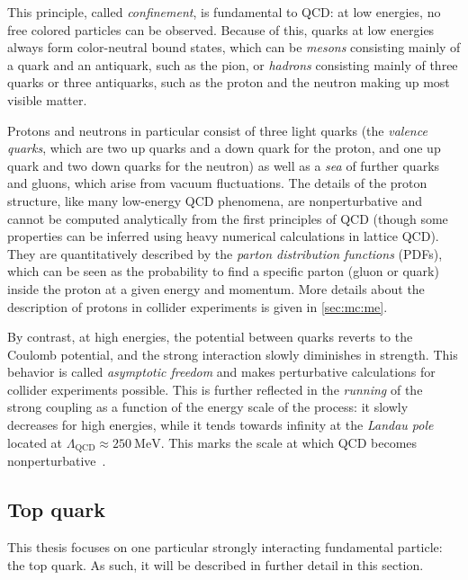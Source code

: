 This principle, called \textit{confinement}, is fundamental to QCD: at low energies, no free colored particles can be observed. Because of this, quarks at low energies always form color-neutral bound states, which can be \textit{mesons} consisting mainly of a quark and an antiquark, such as the pion, or \textit{hadrons} consisting mainly of three quarks or three antiquarks, such as the proton and the neutron making up most visible matter. 

Protons and neutrons in particular consist of three light quarks (the \textit{valence quarks}, which are two up quarks and a down quark for the proton, and one up quark and two down quarks for the neutron) as well as a \textit{sea} of further quarks and gluons, which arise from vacuum fluctuations. The details of the proton structure, like many low-energy QCD phenomena, are nonperturbative and cannot be computed analytically from the first principles of QCD (though some properties can be inferred using heavy numerical calculations in lattice QCD). They are quantitatively described by the \textit{parton distribution functions} (PDFs), which can be seen as the probability to find a specific parton (gluon or quark) inside the proton at a given energy and momentum. More details about the description of protons in collider experiments is given in \cref{sec:mc:me}.

By contrast, at high energies, the potential between quarks reverts to the Coulomb potential, and the strong interaction slowly diminishes in strength. This behavior is called \textit{asymptotic freedom} and makes perturbative calculations for collider experiments possible. This is further reflected in the \textit{running} of the strong coupling \alphas as a function of the energy scale of the process: it slowly decreases for high energies, while it tends towards infinity at the \textit{Landau pole} located at $\Lambda_{\mathrm{QCD}} \approx \SI{250}{\MeV}$. This marks the scale at which QCD becomes nonperturbative~\cite{Peskin:1995ev,Skands:2012ts}.

\subsection{Top quark}

This thesis focuses on one particular strongly interacting fundamental particle: the top quark. As such, it will be described in further detail in this section.

